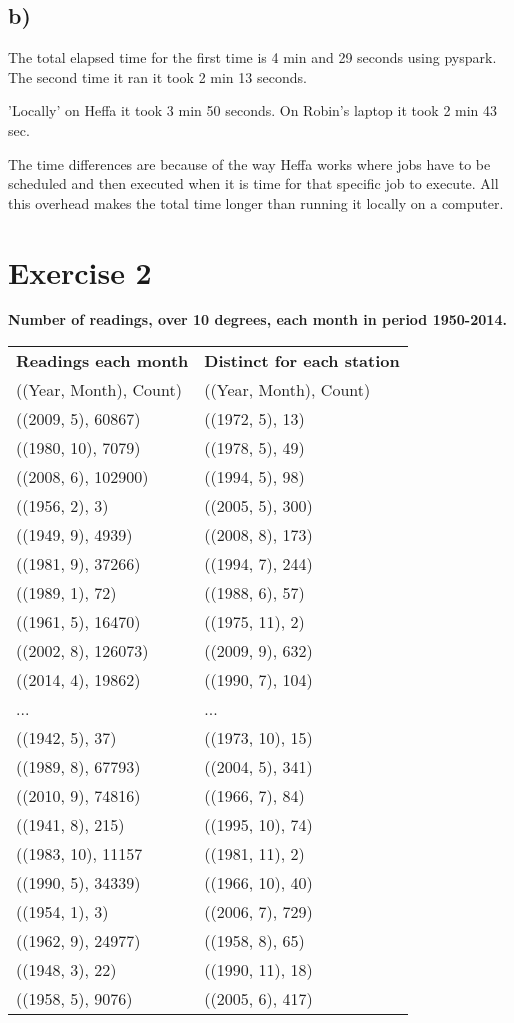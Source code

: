 \documentclass[a4paper,titlepage,12pt]{article}
\begin{document}
\subsection{b)}
The total elapsed time for the first time is 4 min and 29 seconds using pyspark.
The second time it ran it took 2 min 13 seconds.

'Locally' on Heffa it took 3 min 50 seconds. On Robin's laptop it took 2 min 43
sec.

The time differences are because of the way Heffa works where jobs have to be
scheduled and then executed when it is time for that specific job to execute.
All this overhead makes the total time longer than running it locally on a
computer.

\section{Exercise 2}
\textbf{Number of readings, over 10 degrees, each month in period 1950-2014.}
\begin{tabular}{l | l}
  \bf Readings each month & \bf Distinct for each station \\ 
  ((Year, Month), Count) & ((Year, Month), Count) \\
  \hline
  ((2009, 5), 60867) & ((1972, 5), 13)  \\ 
  ((1980, 10), 7079) & ((1978, 5), 49)  \\ 
  ((2008, 6), 102900)& ((1994, 5), 98)  \\
  ((1956, 2), 3)     & ((2005, 5), 300) \\
  ((1949, 9), 4939)  & ((2008, 8), 173) \\
  ((1981, 9), 37266) & ((1994, 7), 244) \\
  ((1989, 1), 72)    & ((1988, 6), 57)  \\
  ((1961, 5), 16470) & ((1975, 11), 2)  \\
  ((2002, 8), 126073)& ((2009, 9), 632) \\
  ((2014, 4), 19862) & ((1990, 7), 104) \\
  ... & ... \\
  ((1942, 5), 37)   & ((1973, 10), 15) \\
  ((1989, 8), 67793)& ((2004, 5), 341) \\
  ((2010, 9), 74816)& ((1966, 7), 84)  \\
  ((1941, 8), 215)  & ((1995, 10), 74) \\
  ((1983, 10), 11157& ((1981, 11), 2)  \\
  ((1990, 5), 34339)& ((1966, 10), 40) \\
  ((1954, 1), 3)    & ((2006, 7), 729) \\
  ((1962, 9), 24977)& ((1958, 8), 65)  \\
  ((1948, 3), 22)   & ((1990, 11), 18) \\
  ((1958, 5), 9076) & ((2005, 6), 417) \\
\end{tabular}
\end{document}
